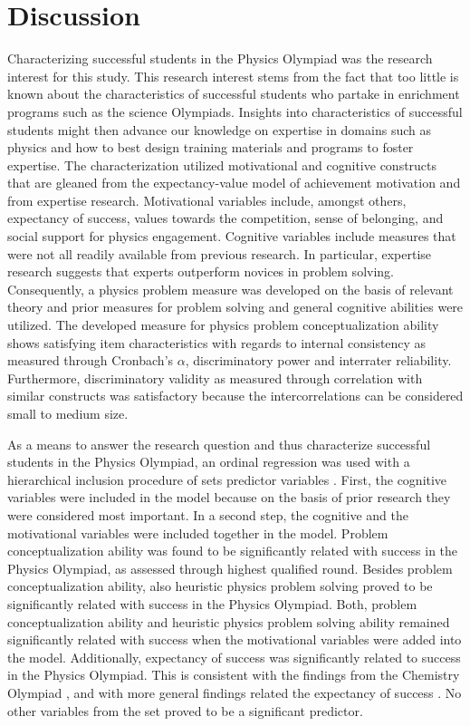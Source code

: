 \documentclass[]{interact}
\begin{document}


\section{Discussion}

Characterizing successful students in the Physics Olympiad was the research interest for this study. This research interest stems from the fact that too little is known about the characteristics of successful students who partake in enrichment programs such as the science Olympiads. Insights into characteristics of successful students might then advance our knowledge on expertise in domains such as physics and how to best design training materials and programs to foster expertise. The characterization utilized motivational and cognitive constructs that are gleaned from the expectancy-value model of achievement motivation and from expertise research. Motivational variables include, amongst others, expectancy of success, values towards the competition, sense of belonging, and social support for physics engagement. Cognitive variables include measures that were not all readily available from previous research. In particular, expertise research suggests that experts outperform novices in problem solving. Consequently, a physics problem measure was developed on the basis of relevant theory and prior measures for problem solving and general cognitive abilities were utilized. The developed measure for physics problem conceptualization ability shows satisfying item characteristics with regards to internal consistency as measured through Cronbach's $\alpha$, discriminatory power and interrater reliability. Furthermore, discriminatory validity as measured through correlation with similar constructs \citep{Campbell.1959} was satisfactory because the intercorrelations can be considered small to medium size. 

As a means to answer the research question and thus characterize successful students in the Physics Olympiad, an ordinal regression was used with a hierarchical inclusion procedure of sets predictor variables \citep{Field.2012}. First, the cognitive variables were included in the model because on the basis of prior research they were considered most important. In a second step, the cognitive and the motivational variables were included together in the model. Problem conceptualization ability was found to be significantly related with success in the Physics Olympiad, as assessed through highest qualified round. Besides problem conceptualization ability, also heuristic physics problem solving proved to be significantly related with success in the Physics Olympiad. Both, problem conceptualization ability and heuristic physics problem solving ability remained significantly related with success when the motivational variables were added into the model. Additionally, expectancy of success was significantly related to success in the Physics Olympiad. This is consistent with the findings from the Chemistry Olympiad \citep{Urhahne.2012}, and with more general findings related the expectancy of success \citep{Eccles.1995}. No other variables from the set proved to be a significant predictor.
\end{document}
